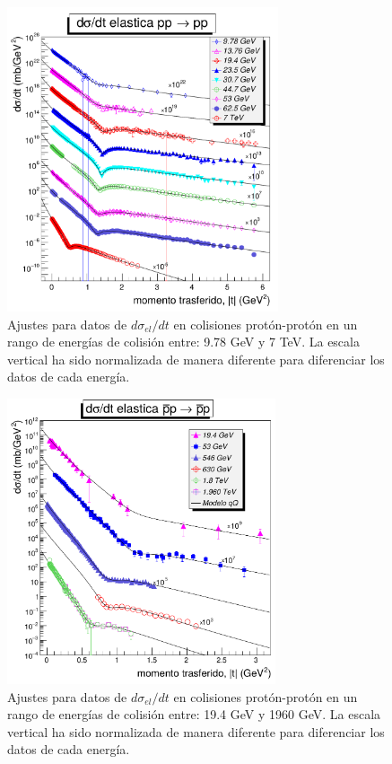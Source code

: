 \begin{figure}[H]\centering
\includegraphics[width=8cm]{graficas/multifit.pdf}
\caption{\mismall Ajustes para datos de $d\sigma_{el}/dt$ en colisiones prot\'on-prot\'on en un rango de energías de colisión entre: 9.78 GeV y 7 TeV. La escala vertical ha sido normalizada de manera diferente para diferenciar los datos de cada energía.}
\label{lafig_14}
\end{figure}%
\begin{figure}[H]\centering
\includegraphics[width=7.9cm]{graficas/multifitl.pdf}
\caption{\mismall Ajustes para datos de $d\sigma_{el}/dt$ en colisiones prot\'on-prot\'on en un rango de energías de colisión entre: 19.4 GeV y 1960 GeV. La escala vertical ha sido normalizada de manera diferente para diferenciar los datos de cada energía.}
\label{lafig_15}
\end{figure}\vskip -0.5cm
